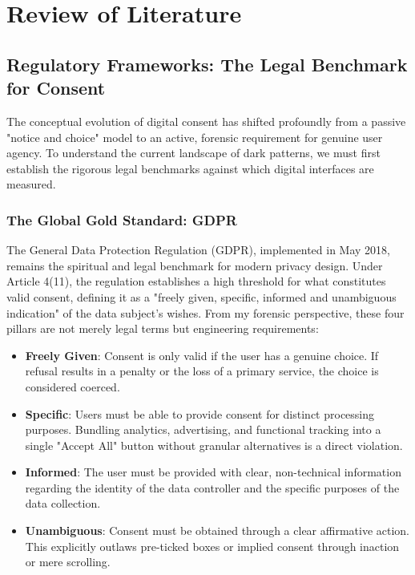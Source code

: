 \documentclass[12pt,a4paper]{report}
\begin{document}
\newpage

\chapter{Review of Literature}

\section{Regulatory Frameworks: The Legal Benchmark for Consent}

The conceptual evolution of digital consent has shifted profoundly from a passive "notice and choice" model to an active, forensic requirement for genuine user agency. To understand the current landscape of dark patterns, we must first establish the rigorous legal benchmarks against which digital interfaces are measured.

\subsection{The Global Gold Standard: GDPR}

The General Data Protection Regulation (GDPR), implemented in May 2018, remains the spiritual and legal benchmark for modern privacy design. Under Article 4(11), the regulation establishes a high threshold for what constitutes valid consent, defining it as a "freely given, specific, informed and unambiguous indication" of the data subject's wishes. From my forensic perspective, these four pillars are not merely legal terms but engineering requirements:

\begin{itemize}[leftmargin=1.5cm]
    \item \textbf{Freely Given}: Consent is only valid if the user has a genuine choice. If refusal results in a penalty or the loss of a primary service, the choice is considered coerced.
    \item \textbf{Specific}: Users must be able to provide consent for distinct processing purposes. Bundling analytics, advertising, and functional tracking into a single "Accept All" button without granular alternatives is a direct violation.
    \item \textbf{Informed}: The user must be provided with clear, non-technical information regarding the identity of the data controller and the specific purposes of the data collection.
    \item \textbf{Unambiguous}: Consent must be obtained through a clear affirmative action. This explicitly outlaws pre-ticked boxes or implied consent through inaction or mere scrolling.
\end{itemize}
\end{document}
